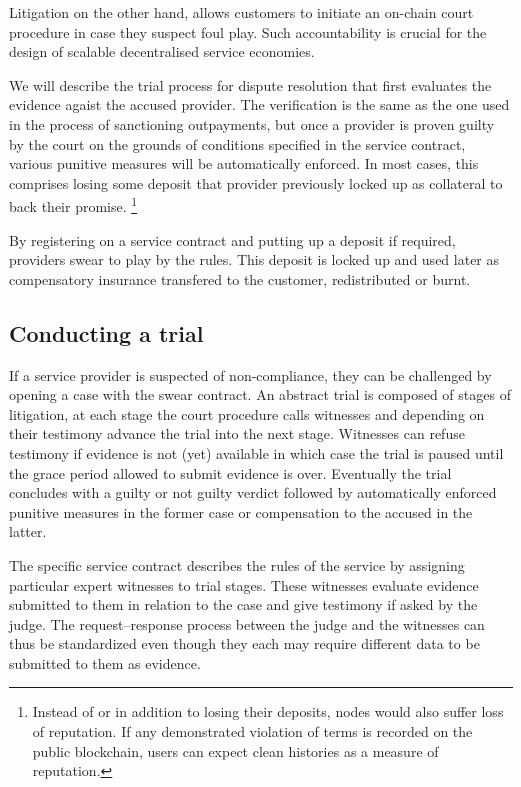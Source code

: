 \documentclass[a4paper,10pt]{article}
\begin{document}
Litigation on the other hand, allows customers to initiate an on-chain court procedure
in case they suspect foul play. Such accountability is
crucial for the design of scalable decentralised service economies.

We will describe the trial process for dispute
resolution that first evaluates the evidence agaist the accused provider.
The verification is the same as the one used in the process of sanctioning outpayments,
but once a provider is proven guilty by the court on the grounds of
conditions specified in the service contract, various punitive measures will be
automatically enforced. In most cases, this comprises losing some deposit that
provider previously locked up as collateral to back their promise.%
%
\footnote{Instead of or in addition to losing their deposits, nodes would also
suffer loss of reputation. If any demonstrated violation of terms is
recorded on the public blockchain, users can expect clean histories as a measure
of reputation.}
%

By registering on a service contract and putting up a deposit if required, providers
swear to play by the rules.
This deposit is locked up and used later as compensatory insurance transfered to the
customer, redistributed or burnt.


\subsection{Conducting a trial}

If a service provider is suspected of non-compliance, they can be challenged
by opening a case with the swear contract.
An abstract trial is composed of stages of litigation, at each stage
the court procedure calls witnesses and depending on their testimony
advance the trial into the next stage. Witnesses can refuse testimony
if evidence is not (yet) available in which case the trial
is paused until the grace period allowed to submit evidence is over.
Eventually the trial concludes with a guilty or not guilty verdict followed
by automatically enforced punitive measures in the former case or
compensation to the accused in the latter.

The specific service contract describes the rules of the service
by assigning particular expert witnesses to trial stages. These witnesses
evaluate evidence submitted to them in relation to the case
and give testimony if asked by the judge.
The request--response process between the judge and the witnesses can
thus be standardized
even though they each may require different data to be submitted to them as evidence.
\end{document}
